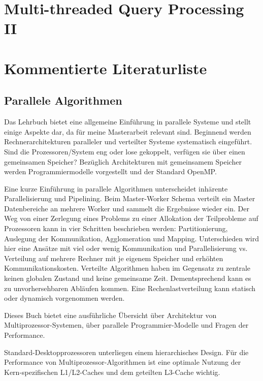 \documentclass[a4paper,12pt,twoside]{article}
\begin{document}
\section*{Multi-threaded Query Processing II}

\section{Kommentierte Literaturliste}

\subsection{Parallele Algorithmen}

\textbf{}

Das Lehrbuch bietet eine allgemeine Einführung in parallele Systeme und stellt einige Aspekte dar, da für meine Masterarbeit relevant sind.  Beginnend werden Rechnerarchitekturen paralleler und verteilter Systeme systematisch eingeführt. Sind die Prozessoren/System eng oder lose gekoppelt, verfügen sie über einen gemeinsamen Speicher? Bezüglich Architekturen mit gemeinsamem Speicher werden Programmiermodelle vorgestellt und der Standard OpenMP.

Eine kurze Einführung in parallele Algorithmen unterscheidet inhärente Parallelisierung und Pipelining. Beim Master-Worker Schema verteilt ein Master Datenbereiche an mehrere Worker und sammelt die Ergebnisse wieder ein. Der Weg von einer Zerlegung eines Problems zu einer Allokation der Teilprobleme auf Prozessoren kann in vier Schritten beschrieben werden: Partitionierung, Auslegung der Kommunikation, Agglomeration und Mapping. Unterschieden wird hier eine Ansätze mit viel oder wenig Kommunikation und Parallelisierung vs. Verteilung auf mehrere Rechner mit je eigenem Speicher und erhöhten Kommunikationskosten. Verteilte Algorithmen haben im Gegensatz zu zentrale keinen globalen Zustand und keine gemeinsame Zeit. Dementsprechend kann es zu unvorhersehbaren Abläufen kommen. Eine Rechenlastverteilung kann statisch oder dynamisch vorgenommen werden. 

\textbf{}

Dieses Buch bietet eine ausführliche Übersicht über Architektur von Multiprozessor-Systemen, über parallele Programmier-Modelle und Fragen der Performance.

Standard-Desktopprozessoren unterliegen einem hierarchisches Design. Für die Performance von Multiprozessor-Algorithmen ist eine optimale Nutzung der Kern-spezifischen L1/L2-Caches und dem geteilten L3-Cache wichtig. 
\end{document}
